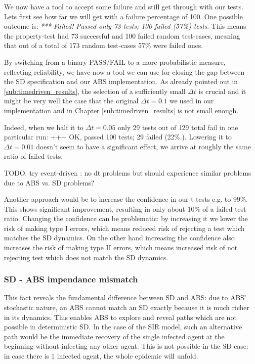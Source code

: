 We now have a tool to accept some failure and still get through with our tests. Lets first see how far we will get with a failure percentage of 100. One possible outcome is: \textit{*** Failed! Passed only 73 tests; 100 failed (57\%) tests}. This means the property-test had 73 successful and 100 failed random test-cases, meaning that out of a total of 173 random test-cases 57\% were failed ones. 

By switching from a binary PASS/FAIL to a more probabilistic measure, reflecting reliability, we have now a tool we can use for closing the gap between the SD specification and our ABS implementation. As already pointed out in \ref{sub:timedriven_results}, the selection of a sufficiently small $\Delta t$ is crucial and it might be very well the case that the original $\Delta t = 0.1$ we used in our implementation and in Chapter \ref{sub:timedriven_results} is not small enough. 

Indeed, when we half it to $\Delta t = 0.05$ only 29 tests out of 129 total fail in one particular run: +++ OK, passed 100 tests; 29 failed (22\%.). Lowering it to $\Delta t = 0.01$ doesn't seem to have a significant effect, we arrive at roughly the same ratio of failed tests.

TODO: try event-driven : no dt problems but should experience similar problems due to ABS vs. SD problems?

Another approach would be to increase the confidence in our t-tests e.g. to 99\%. This shows significant improvement, resulting in only about 10\% of a failed test ratio. Changing the confidence can be problematic: by increasing it we lower the risk of making type I errors, which means reduced risk of rejecting a test which matches the SD dynamics. On the other hand increasing the confidence also increases the risk of making type II errors, which means increased risk of not rejecting test which does not match the SD dynamics. 

\subsubsection{SD - ABS impendance mismatch}
This fact reveals the fundamental difference between SD and ABS: due to ABS' stochastic nature, an ABS cannot match an SD exactly because it is much richer in its dynamics. This enables ABS to explore and reveal paths which are not possible in deterministic SD. In the case of the SIR model, such an alternative path would be the immediate recovery of the single infected agent at the beginning without infecting any other agent. This is not possible in the SD case: in case there is 1 infected agent, the whole epidemic will unfold.

